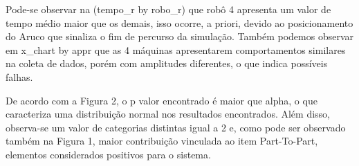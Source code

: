 Pode-se observar na (tempo\_r by robo\_r) que robô 4 apresenta um valor de tempo médio maior que os demais, isso ocorre, a priori, devido ao posicionamento do Aruco que sinaliza o fim de percurso da simulação. Também podemos observar em x\_chart by appr que as 4 máquinas apresentarem comportamentos similares na coleta de dados, porém com amplitudes diferentes, o que indica possíveis falhas.

De acordo com a Figura 2, o p valor encontrado é maior que alpha, o que caracteriza uma distribuição normal nos resultados encontrados. Além disso, observa-se um valor de categorias distintas igual a 2 e, como pode ser observado também na Figura 1, maior contribuição vinculada ao item Part-To-Part, elementos considerados positivos para o sistema.
